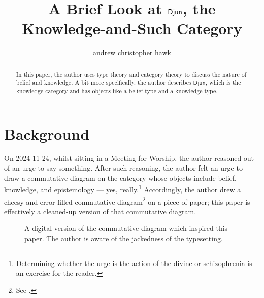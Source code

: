 \documentclass{article}
\title{A Brief Look at \(\category{Djun}\), the Knowledge-and-Such Category}
\author{andrew christopher hawk}
\newcommand{\category}[1]{\mathsf{#1}}
\begin{document}
\maketitle{}

\begin{abstract}
In this paper, the author uses type theory and category theory to discuss the nature of belief and knowledge.  A bit more specifically, the author describes \(\category{Djun}\), which is the knowledge category and has objects like a belief type and a knowledge type.
\end{abstract}

\section{Background}
On 2024-11-24, whilst sitting in a Meeting for Worship, the author reasoned out of an urge to say something.  After such reasoning, the author felt an urge to draw a commutative diagram on the category whose objects include belief, knowledge, and epistemology --- yes, really.\footnote{Determining whether the urge is the action of the divine or schizophrenia is an exercise for the reader.}  Accordingly, the author drew a cheesy and error-filled commutative diagram\footnote{See .} on a piece of paper; this paper is effectively a cleaned-up version of that commutative diagram.

\begin{figure}[h]
  \caption{A digital version of the commutative diagram which inspired this paper.  The author is aware of the jackedness of the typesetting.}\label{fig:originalDiagram}
\end{figure}
\end{document}
